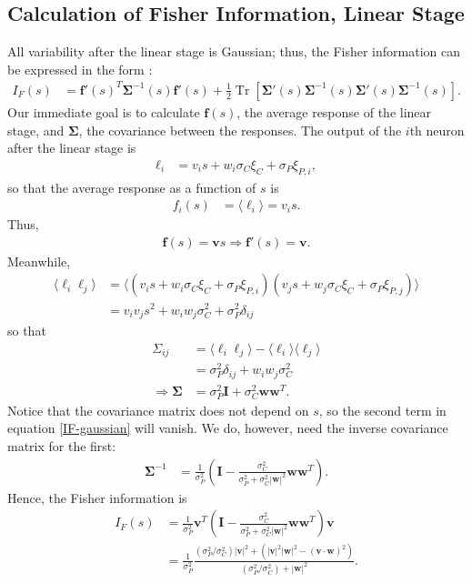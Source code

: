 \documentclass[12pt]{article}
\DeclareMathOperator{\Tr}{Tr}
\begin{document}
\subsection{Calculation of  Fisher Information, Linear Stage}
\label{app:fisher-linear}
All variability after the linear stage is Gaussian; thus, the Fisher information can be expressed in the form \citep{abbott1999, kay1993}:
\begin{align}
	I_{F}(s) &= \mathbf{f}'(s)^T \boldsymbol{\Sigma}^{-1} (s) \mathbf{f}'(s) + \frac{1}{2}\Tr\left[\boldsymbol{\Sigma}'(s) \boldsymbol{\Sigma}^{-1}(s)\boldsymbol{\Sigma}'(s) \boldsymbol{\Sigma}^{-1}(s)\right]. \label{IF-gaussian}
\end{align}
Our immediate goal is to calculate $\mathbf{f}(s)$, the average response of the linear stage, and $\boldsymbol{\Sigma}$, the covariance between the responses. The output of the $i$th neuron after the linear stage is
\begin{align}
	\ell_i &= v_i s + w_i \sigma_C \xi_C + \sigma_P\xi_{P,i},
\end{align}
so that the average response as a function of $s$ is
\begin{align}
	f_i(s) &= \langle \ell_i \rangle = v_i s.
\end{align}
Thus,
\begin{align}
	\mathbf{f}(s) = \mathbf{v}s \Rightarrow \mathbf{f}'(s) = \mathbf{v}.
\end{align}
Meanwhile,
\begin{align}
	\langle \ell_i \ell_j \rangle &= \langle (v_i s + w_i \sigma_C\xi_C + \sigma_P\xi_{P,i}) (v_j s + w_j \sigma_C\xi_C + \sigma_P\xi_{P,j})\rangle \\
	&= v_i v_j s^2 + w_i w_j \sigma_C^2 + \sigma_P^2 \delta_{ij}
\end{align}
	so that
\begin{align}
	\Sigma_{ij} &= \langle \ell_i \ell_j \rangle - \langle \ell_i \rangle \langle \ell_j \rangle \\
	&= \sigma_P^2 \delta_{ij} + w_i w_j \sigma_C^2 \\
	\Rightarrow \boldsymbol{\Sigma} &= \sigma_P^2 \mathbf{I} + \sigma_C^2\mathbf{ww}^T.
\end{align}
Notice that the covariance matrix does not depend on $s$, so the second term in equation \eqref{IF-gaussian} will vanish. We do, however, need the inverse covariance matrix for the first:
\begin{align}
	\boldsymbol{\Sigma}^{-1} &= \frac{1}{\sigma_P^2}\left(\mathbf{I} - \frac{\sigma_C^2}{\sigma_P^2 + \sigma_C^2 |\mathbf{w}|^2}\mathbf{ww}^T\right).
\end{align}
	Hence, the Fisher information is
\begin{align}
	I_{F}(s) &= \frac{1}{\sigma_P^2}\mathbf{v}^T \left(\mathbf{I} - \frac{\sigma_C^2}{\sigma_P^2 + \sigma_C^2 |\mathbf{w}|^2}\mathbf{ww}^T\right) \mathbf{v} \\
	&= \frac{1}{\sigma_P^2}\frac{\left(\sigma_P^2/\sigma_C^2\right) |\mathbf{v}|^2 +  \left(|\mathbf{v}|^2|\mathbf{w}|^2 - (\mathbf{v}\cdot\mathbf{w})^2\right)}{(\sigma_P^2/\sigma_C^2)+ |\mathbf{w}|^2}.
\end{align}
\end{document}
